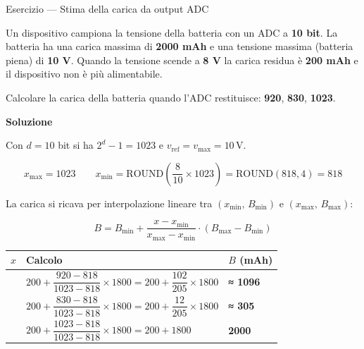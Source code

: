 \documentclass[
  italian,
  openany]{book}
\newcounter{none} %
\begin{document}
\begin{callouttip}{Esercizio — Stima della carica da output ADC}

Un dispositivo campiona la tensione della batteria con un ADC a
\textbf{10 bit}. La batteria ha una carica massima di \textbf{2000 mAh}
e una tensione massima (batteria piena) di \textbf{10 V}. Quando la
tensione scende a \textbf{8 V} la carica residua è \textbf{200 mAh} e il
dispositivo non è più alimentabile.

Calcolare la carica della batteria quando l'ADC restituisce:
\textbf{920}, \textbf{830}, \textbf{1023}.

\textbf{Soluzione}

Con \(d = 10\) bit si ha \(2^d - 1 = 1023\) e
\(v_{\mathrm{ref}} = v_{\mathrm{max}} = 10\,\mathrm{V}\).

\[x_{\mathrm{max}} = 1023 \qquad x_{\mathrm{min}} = \mathrm{ROUND}\!\left(\frac{8}{10} \times 1023\right) = \mathrm{ROUND}(818{,}4) = 818\]

La carica si ricava per interpolazione lineare tra
\((x_{\mathrm{min}},\, B_{\mathrm{min}})\) e
\((x_{\mathrm{max}},\, B_{\mathrm{max}})\):

\[B = B_{\mathrm{min}} + \frac{x - x_{\mathrm{min}}}{x_{\mathrm{max}} - x_{\mathrm{min}}} \cdot (B_{\mathrm{max}} - B_{\mathrm{min}})\]

{\def\LTcaptype{none} %
\begin{longtable}[]{@{}
  >{\raggedright\arraybackslash}p{}
  >{\raggedright\arraybackslash}p{}
  >{\raggedright\arraybackslash}p{}@{}}
\toprule\noalign{}
\begin{minipage}[b]{\linewidth}\raggedright
\(x\)
\end{minipage} & \begin{minipage}[b]{\linewidth}\raggedright
Calcolo
\end{minipage} & \begin{minipage}[b]{\linewidth}\raggedright
\(B\) (mAh)
\end{minipage} \\
\midrule\noalign{}
\endhead
\bottomrule\noalign{}
\endlastfoot
920 &
\(200 + \dfrac{920 - 818}{1023 - 818} \times 1800 = 200 + \dfrac{102}{205} \times 1800\)
& \textbf{≈ 1096} \\
830 &
\(200 + \dfrac{830 - 818}{1023 - 818} \times 1800 = 200 + \dfrac{12}{205} \times 1800\)
& \textbf{≈ 305} \\
1023 & \(200 + \dfrac{1023 - 818}{1023 - 818} \times 1800 = 200 + 1800\)
& \textbf{2000} \\
\end{longtable}
}

\end{callouttip}
\end{document}
